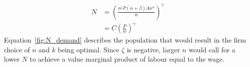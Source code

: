 \begin{align}\label{fig:N_demand}
N   &= (\frac{n^\zeta P(\alpha+\beta)A\kappa^\alpha}{w})^\gamma  \nonumber\\
    &= C \left(\frac{P}{w}\right)^\gamma
\end{align}
Equation~\ref{fig:N_demand} describes the population that would result in the firm choice of $n$ and $k$ being optimal. Since $\zeta$ is negative, larger  $n$ would call for a lower $N$ to achieve a value marginal product of labour equal to the wage.



